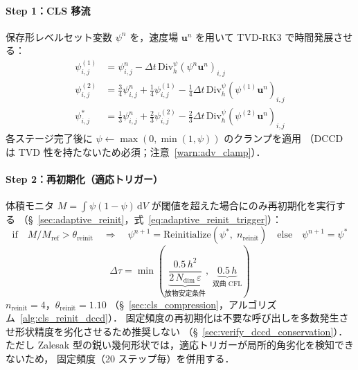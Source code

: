 \label{alg:full_timestep}
\begin{tcolorbox}[algbox, title={1 タイムステップ $t^n \to t^{n+1}$ の完全アルゴリズム}]

\paragraph{Step 1：CLS 移流}
保存形レベルセット変数 $\psi^n$ を，速度場 $\bm{u}^n$ を用いて TVD-RK3 で時間発展させる：
\begin{align*}
  \psi^{(1)}_{i,j} &= \psi^n_{i,j} - \Delta t \, \mathrm{Div}_h^{\psi}(\psi^n \bm{u}^n)_{i,j} \\
  \psi^{(2)}_{i,j} &= \tfrac{3}{4}\psi^n_{i,j} + \tfrac{1}{4}\psi^{(1)}_{i,j} - \tfrac{1}{4}\Delta t \, \mathrm{Div}_h^{\psi}(\psi^{(1)} \bm{u}^n)_{i,j} \\
  \psi^*_{i,j} &= \tfrac{1}{3}\psi^n_{i,j} + \tfrac{2}{3}\psi^{(2)}_{i,j} - \tfrac{2}{3}\Delta t \, \mathrm{Div}_h^{\psi}(\psi^{(2)} \bm{u}^n)_{i,j}
\end{align*}
各ステージ完了後に $\psi \leftarrow \max(0,\min(1,\psi))$ のクランプを適用
（DCCD は TVD 性を持たないため必須；注意~\ref{warn:adv_clamp}）．

\paragraph{Step 2：再初期化（適応トリガー）}
体積モニタ $M = \int\psi(1-\psi)\,\mathrm{d}V$ が閾値を超えた場合にのみ再初期化を実行する
（§~\ref{sec:adaptive_reinit}，式~\eqref{eq:adaptive_reinit_trigger}）：
\[
  \text{if}\quad M / M_{\mathrm{ref}} > \theta_{\mathrm{reinit}}
  \quad\Longrightarrow\quad
  \psi^{n+1} = \mathrm{Reinitialize}(\psi^*,\; n_{\mathrm{reinit}})
  \quad\text{else}\quad
  \psi^{n+1} = \psi^*
\]
\begin{equation}
  \Delta\tau = \min\!\left(
    \underbrace{\frac{0.5\,h^2}{2\,N_{\mathrm{dim}}\,\varepsilon}}_{\text{放物安定条件}},\;
    \underbrace{0.5\,h}_{\text{双曲 CFL}}
  \right)
  \label{eq:dtau_reinit_def}
\end{equation}
$n_{\mathrm{reinit}} = 4$，$\theta_{\mathrm{reinit}} = 1.10$
（§~\ref{sec:cls_compression}，アルゴリズム~\ref{alg:cls_reinit_dccd}）．
固定頻度の再初期化は不要な呼び出しを多数発生させ形状精度を劣化させるため推奨しない
（§~\ref{sec:verify_dccd_conservation}）．
ただし Zalesak 型の鋭い幾何形状では，適応トリガーが局所的角劣化を検知できないため，
固定頻度（20 ステップ毎）を併用する．


\end{tcolorbox}
